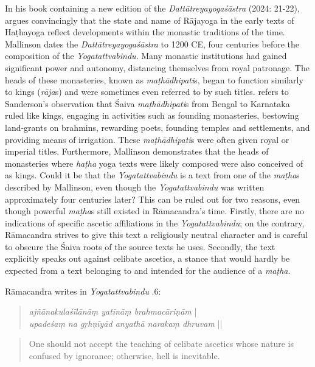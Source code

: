 In his book containing a new edition of the \emph{Dattātreyayogaśāstra} (2024: 21-22), \citeauthor{datta2024} argues convincingly that the state and name of Rājayoga in the early texts of Haṭhayoga reflect developments within the monastic traditions of the time. Mallinson dates the \emph{Dattātreyayogaśāstra} to 1200 CE, four centuries before the composition of the \emph{Yogatattvabindu}. Many monastic institutions had gained significant power and autonomy, distancing themselves from royal patronage. The heads of these monasteries, known as \textit{maṭhādhipati}s, began to function similarly to kings (\textit{rāja}s) and were sometimes even referred to by such titles. \citeauthor{datta2024} refers to Sanderson's observation that Śaiva \textit{maṭhādhipati}s from Bengal to Karnataka ruled like kings, engaging in activities such as founding monasteries, bestowing land-grants on brahmins, rewarding poets, founding temples and settlements, and providing means of irrigation. These \textit{maṭhādhipati}s were often given royal or imperial titles. Furthermore, Mallinson demonstrates that the heads of monasteries where \textit{haṭha} yoga texts were likely composed were also conceived of as kings. Could it be that the \emph{Yogatattvabindu} is a text from one of the \textit{maṭha}s described by Mallinson, even though the \emph{Yogatattvabindu} was written approximately four centuries later? This can be ruled out for two reasons, even though powerful \textit{maṭha}s still existed in Rāmacandra's time. Firstly, there are no indications of specific ascetic affiliations in the \emph{Yogatattvabindu}; on the contrary, Rāmacandra strives to give this text a religiously neutral character and is careful to obscure the Śaiva roots of the source texts he uses. Secondly, the text explicitly speaks out against celibate ascetics, a stance that would hardly be expected from a text belonging to and intended for the audience of a \textit{maṭha}.

Rāmacandra writes in \emph{Yogatattvabindu} .6:
\begin{quote}
  \textit{ajñānakulaśīlānāṃ yatīnāṃ brahmacāriṇām} | \\
  \textit{upadeśaṃ na gṛhṇīyād anyathā narakaṃ dhruvam} ||
\end{quote}
\begin{quote}
  One should not accept the teaching of celibate ascetics whose nature is confused by ignorance; otherwise, hell is inevitable. 
\end{quote}

